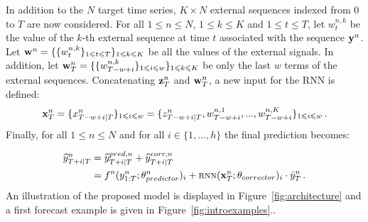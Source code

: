 \documentclass[10pt]{article} %
\newcommand{\ts}{y}
\newcommand{\fullts}{{\bf \ts}}
\newcommand{\tspred}{\widehat{\ts}}
\newcommand{\stat}{f}
\newcommand{\statparam}{\theta_{predictor}}
\newcommand{\lag}{h}
\newcommand{\window}{w}
\newcommand{\meants}{\Bar{\ts}}
\newcommand{\rnnwindow}{{\bf \rnninput}}
\newcommand{\rnninput}{z}
\newcommand{\rnn}{\textsc{rnn}}
\newcommand{\rnnparam}{\theta_{corrector}}
\newcommand{\ws}{w}
\newcommand{\fullws}{{\bf \ws}}
\newcommand{\concatinput}{x}
\newcommand{\fullconcatinput}{{ \bf \concatinput}}
\begin{document}
In addition to the $N$ target time series, $K \times N$ external sequences indexed from $0$ to $T$ are now considered. For all $1\leqslant n \leqslant N$, $1\leqslant k \leqslant K$ and  $1\leqslant t \leqslant T$, let $\ws^{n,k}_t$ be the value of the $k$-th external sequence at time $t$ associated with the sequence $\fullts^n$. Let  $\fullws^n = \{\{\ws_t^{n,k}\}_{1\leqslant t \leqslant T}\}_{1\leqslant k \leqslant K}$ be all the values of the external signals. In addition, let $\fullws^n_T = \{\{\ws_{T-w+i}^{n,k}\}_{1\leqslant i \leqslant \window}\}_{1\leqslant k \leqslant K}$ be only the last $\window$ terms of the external sequences. Concatenating $ \rnnwindow^n_T$ and $\fullws^n_T$, a new input for the RNN is defined:   
$$
\fullconcatinput^n_T = \{\concatinput^n_{T-w+i|T}\}_{1\leqslant i \leqslant w}= \{\rnninput^n_{T-w+i|T}, \ws^{n,1}_{T-w+i},...,\ws^{n,K}_{T-w+i}\}_{1\leqslant i \leqslant w}\,.
$$
Finally, for all $1\leqslant n \leqslant N$ and for all $i \in \{1,\ldots,\lag\}$ the final prediction becomes:

\begin{align}
\label{eq:withws:full:model}
\tspred^n_{T+i|T}  &= \tspred^{pred,n}_{T+i|T} +  \tspred^{corr,n}_{T+i|T}\\
& = \stat^n(\ts^n_{1:T};\statparam^n)_i +  \rnn(\fullconcatinput^n_T;\rnnparam)_i \cdot \meants^n_T\,.\nonumber
\end{align}
An illustration of the proposed  model is displayed in Figure~\ref{fig:architecture} and a first forecast example is given in Figure~\ref{fig:introexamples}..
\end{document}
